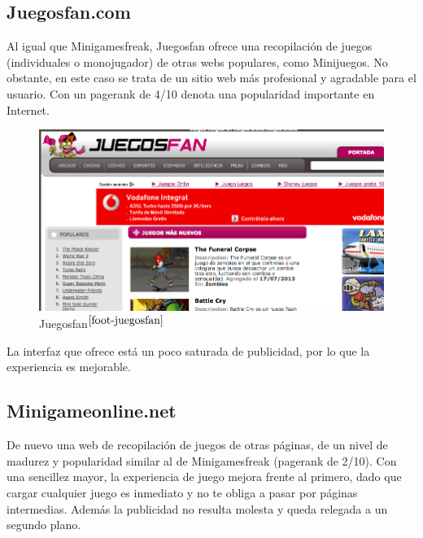\subsection*{Juegosfan.com}

Al igual que Minigamesfreak, Juegosfan ofrece una recopilación de juegos (individuales o monojugador) de otras webs populares, como Minijuegos. No obstante, en este caso se trata de un sitio web más profesional y agradable para el usuario. Con un pagerank de 4/10 denota una popularidad importante en Internet.

\begin{figure}[h]
  \begin{center}
    \includegraphics[width=\textwidth]{images/juegosfan.png}
    \caption[Juegosfan]{Juegosfan$^{\ref{foot-juegosfan}}$}
    \label{fig::juegosfan}
  \end{center}
\end{figure}

La interfaz que ofrece está un poco saturada de publicidad, por lo que la experiencia es mejorable.

\subsection*{Minigameonline.net}

De nuevo una web de recopilación de juegos de otras páginas, de un nivel de madurez y popularidad similar al de Minigamesfreak (pagerank de 2/10). Con una sencillez mayor, la experiencia de juego mejora frente al primero, dado que cargar cualquier juego es inmediato y no te obliga a pasar por páginas intermedias. Además la publicidad no resulta molesta y queda relegada a un segundo plano.

